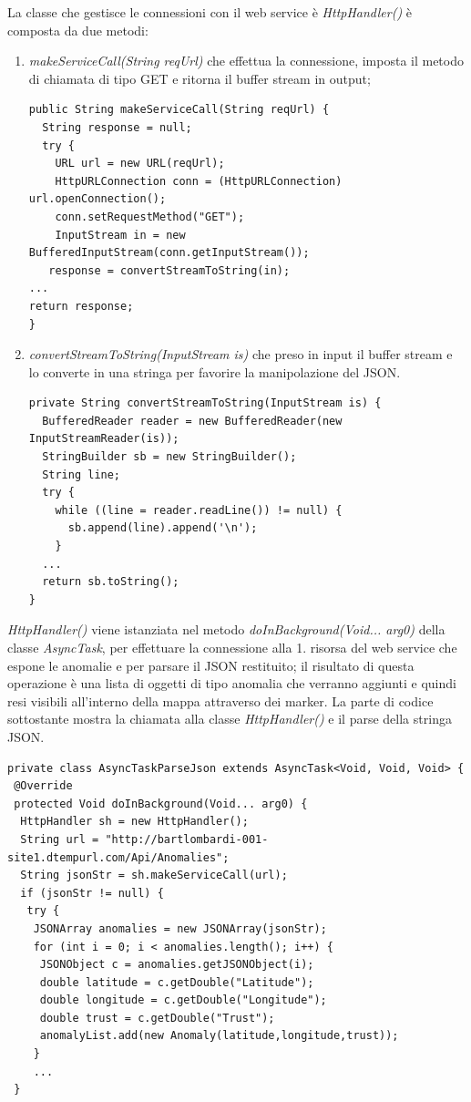 \documentclass[a4paper, 11pt]{article} %
\begin{document}
La classe che gestisce le connessioni con il web service è \textit{HttpHandler()} è composta da due metodi: 
\begin{enumerate}
	\item \textit{makeServiceCall(String reqUrl)} che effettua la connessione, imposta il metodo di chiamata di tipo GET e ritorna il buffer stream in output;
\begin{lstlisting}
public String makeServiceCall(String reqUrl) {
  String response = null;
  try {
    URL url = new URL(reqUrl);
    HttpURLConnection conn = (HttpURLConnection) url.openConnection();
    conn.setRequestMethod("GET");
    InputStream in = new BufferedInputStream(conn.getInputStream());
   response = convertStreamToString(in);
...
return response;
}
\end{lstlisting}
	\item \textit{convertStreamToString(InputStream is)} che preso in input il buffer stream e lo converte in una stringa per favorire la manipolazione del JSON.
\begin{lstlisting}
private String convertStreamToString(InputStream is) {
  BufferedReader reader = new BufferedReader(new InputStreamReader(is));
  StringBuilder sb = new StringBuilder();
  String line;
  try {
    while ((line = reader.readLine()) != null) {
      sb.append(line).append('\n');
    }
  ...
  return sb.toString();
}
\end{lstlisting}	
\end{enumerate}
\textit{HttpHandler()} viene istanziata nel metodo \textit{doInBackground(Void... arg0)} della classe \textit{AsyncTask}, per effettuare la connessione alla 1. risorsa del web service che espone le anomalie e per parsare il JSON restituito; il risultato di questa operazione è una lista di oggetti di tipo anomalia che verranno aggiunti e quindi resi visibili all'interno della mappa attraverso dei marker. La parte di codice sottostante mostra la chiamata alla classe \textit{HttpHandler()} e il parse della stringa JSON.
\begin{lstlisting}
private class AsyncTaskParseJson extends AsyncTask<Void, Void, Void> {
 @Override
 protected Void doInBackground(Void... arg0) {
  HttpHandler sh = new HttpHandler();
  String url = "http://bartlombardi-001-site1.dtempurl.com/Api/Anomalies";
  String jsonStr = sh.makeServiceCall(url);
  if (jsonStr != null) {
   try {
    JSONArray anomalies = new JSONArray(jsonStr);
    for (int i = 0; i < anomalies.length(); i++) {
     JSONObject c = anomalies.getJSONObject(i);
     double latitude = c.getDouble("Latitude");
     double longitude = c.getDouble("Longitude");
     double trust = c.getDouble("Trust");
     anomalyList.add(new Anomaly(latitude,longitude,trust));
    }
    ...
 }
\end{lstlisting}
\end{document}

